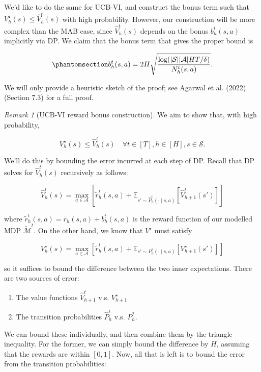 \documentclass[
  letterpaper,
  DIV=11,
  numbers=noendperiod]{scrreprt}
\theoremstyle{plain}
\theoremstyle{plain}
\theoremstyle{definition}
\theoremstyle{definition}
\theoremstyle{remark}
\newtheorem{refremark}{Remark}[chapter]
\begin{document}
We'd like to do the same for UCB-VI, and construct the bonus term such
that \(V^\star_h(s) \le \widehat{V}_h^t(s)\) with high probability.
However, our construction will be more complex than the MAB case, since
\(\widehat{V}_h^t(s)\) depends on the bonus \(b_h^t(s, a)\) implicitly
via DP. We claim that the bonus term that gives the proper bound is

\begin{equation}\phantomsection\label{eq-ucb_vi_bonus}{
b_h^t(s, a) = 2 H \sqrt{\frac{\log( |\mathcal{S}||\mathcal{A}|H T/\delta )}{N_h^t(s, a)}}.
}\end{equation}

We will only provide a heuristic sketch of the proof; see Agarwal et al.
(2022) (Section 7.3) for a full proof.

\begin{refremark}[UCB-VI reward bonus construction]
We aim to show that, with high probability,

\[V_h^\star(s) \le \widehat{V}_h^t(s) \quad \forall t \in [T], h \in [H], s \in \mathcal{S}.\]

We'll do this by bounding the error incurred at each step of DP. Recall
that DP solves for \(\widehat{V}_h^t(s)\) recursively as follows:

\[\widehat{V}_h^t(s) = \max_{a \in \mathcal{A}} \left[ \tilde r^t_h(s, a) + \mathbb{E}_{s' \sim \widehat{P}_h^t(\cdot \mid s, a)} \left[ \widehat{V}_{h+1}^t(s') \right] \right]\]

where \(\tilde r^t_h(s, a) = r_h(s, a) + b_h^t(s, a)\) is the reward
function of our modelled MDP \(\tilde{\mathcal{M}}^t\). On the other
hand, we know that \(V^\star\) must satisfy

\[V^\star_h(s) = \max_{a \in \mathcal{A}} \left[ \tilde r^t_h(s, a) + \mathbb{E}_{s' \sim P^?_h(\cdot \mid s, a)} [V^\star_{h+1}(s')] \right]\]

so it suffices to bound the difference between the two inner
expectations. There are two sources of error:

\begin{enumerate}
\def\labelenumi{\arabic{enumi}.}
\item
  The value functions \(\widehat{V}^t_{h+1}\) v.s. \(V^\star_{h+1}\)
\item
  The transition probabilities \(\widehat{P}_h^t\) v.s. \(P^?_h\).
\end{enumerate}

We can bound these individually, and then combine them by the triangle
inequality. For the former, we can simply bound the difference by \(H\),
assuming that the rewards are within \([0, 1]\). Now, all that is left
is to bound the error from the transition probabilities:


\end{refremark}
\end{document}
